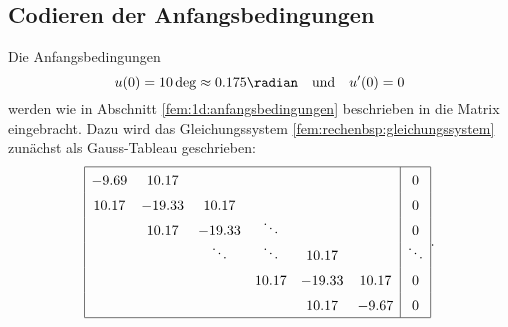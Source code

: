 \subsection{Codieren der Anfangsbedingungen}
Die Anfangsbedingungen
\begin{equation*}
    u(0) = 10 \deg \approx 0.175 \radian
    \quad \text{und} \quad
    u'(0) = 0
\end{equation*}
werden wie in Abschnitt \ref{fem:1d:anfangsbedingungen} beschrieben in die Matrix eingebracht.
Dazu wird das Gleichungssystem \eqref{fem:rechenbsp:gleichungssystem} zunächst als Gauss-Tableau geschrieben:
\begin{equation*}
    \def\arraystretch{1.5}
    \begin{array}{|cccccc|c|}
        \hline
        -9.69  & 10.17  &                &                &        &        & 0              \\
        10.17  &-19.33  & 10.17          &                &        &        & 0              \\
               & 10.17  &-19.33          & \smash{\ddots} &        &        & 0              \\
               &        & \smash{\ddots} & \smash{\ddots} & 10.17  &        & \smash{\ddots} \\
               &        &                & 10.17          &-19.33  & 10.17  & 0              \\
               &        &                &                & 10.17  & -9.67  & 0              \\
        \hline
    \end{array}.
\end{equation*}

